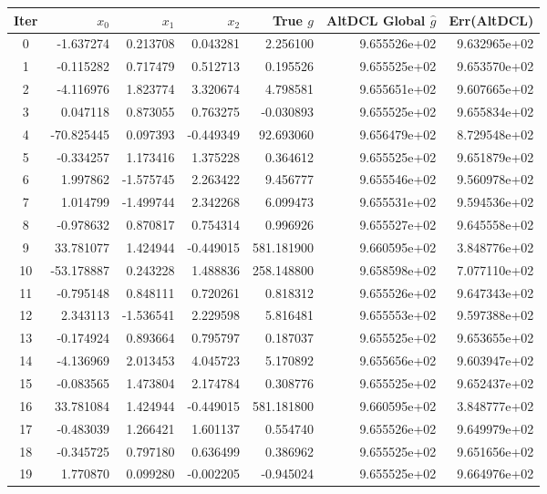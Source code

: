 \begin{tabular}{c rrr r rr}
\toprule
Iter & $x_0$ & $x_1$ & $x_2$ & True $g$ & AltDCL Global $\hat g$ & Err(AltDCL) \\
\midrule
0 & -1.637274 & 0.213708 & 0.043281 & 2.256100 & 9.655526e+02 & 9.632965e+02 \\
1 & -0.115282 & 0.717479 & 0.512713 & 0.195526 & 9.655525e+02 & 9.653570e+02 \\
2 & -4.116976 & 1.823774 & 3.320674 & 4.798581 & 9.655651e+02 & 9.607665e+02 \\
3 & 0.047118 & 0.873055 & 0.763275 & -0.030893 & 9.655525e+02 & 9.655834e+02 \\
4 & -70.825445 & 0.097393 & -0.449349 & 92.693060 & 9.656479e+02 & 8.729548e+02 \\
5 & -0.334257 & 1.173416 & 1.375228 & 0.364612 & 9.655525e+02 & 9.651879e+02 \\
6 & 1.997862 & -1.575745 & 2.263422 & 9.456777 & 9.655546e+02 & 9.560978e+02 \\
7 & 1.014799 & -1.499744 & 2.342268 & 6.099473 & 9.655531e+02 & 9.594536e+02 \\
8 & -0.978632 & 0.870817 & 0.754314 & 0.996926 & 9.655527e+02 & 9.645558e+02 \\
9 & 33.781077 & 1.424944 & -0.449015 & 581.181900 & 9.660595e+02 & 3.848776e+02 \\
10 & -53.178887 & 0.243228 & 1.488836 & 258.148800 & 9.658598e+02 & 7.077110e+02 \\
11 & -0.795148 & 0.848111 & 0.720261 & 0.818312 & 9.655526e+02 & 9.647343e+02 \\
12 & 2.343113 & -1.536541 & 2.229598 & 5.816481 & 9.655553e+02 & 9.597388e+02 \\
13 & -0.174924 & 0.893664 & 0.795797 & 0.187037 & 9.655525e+02 & 9.653655e+02 \\
14 & -4.136969 & 2.013453 & 4.045723 & 5.170892 & 9.655656e+02 & 9.603947e+02 \\
15 & -0.083565 & 1.473804 & 2.174784 & 0.308776 & 9.655525e+02 & 9.652437e+02 \\
16 & 33.781084 & 1.424944 & -0.449015 & 581.181800 & 9.660595e+02 & 3.848777e+02 \\
17 & -0.483039 & 1.266421 & 1.601137 & 0.554740 & 9.655526e+02 & 9.649979e+02 \\
18 & -0.345725 & 0.797180 & 0.636499 & 0.386962 & 9.655525e+02 & 9.651656e+02 \\
19 & 1.770870 & 0.099280 & -0.002205 & -0.945024 & 9.655525e+02 & 9.664976e+02 \\

\end{tabular}
